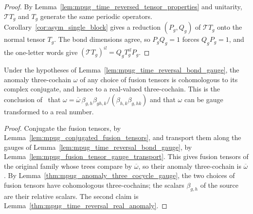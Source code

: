 \begin{proof}
    \leanok
    By Lemma~\ref{lem:mpug_time_reversed_tensor_properties} and
    unitarity, $\mathcal TT_g$ and $T_g$ generate the same periodic
    operators. Corollary~\ref{cor:asym_single_block} gives a reduction
    $(P_g,Q_g)$ of $\mathcal TT_g$ onto the normal tensor $T_g$. The bond
    dimensions agree, so $P_gQ_g=1$ forces $Q_gP_g=1$, and the one-letter
    words give $(\mathcal TT_g)^{il}=Q_gT_g^{il}P_g$.
\end{proof}

\begin{lemma}
    \label{lem:mpug_time_reversal_tensor_real_anomaly}
    \leanok
    Under the hypotheses of Lemma~\ref{lem:mpug_time_reversal_bond_gauge},
    the anomaly three-cochain $\omega$ of any choice of fusion tensors is
    cohomologous to its complex conjugate, and hence to a real-valued
    three-cochain. This is the conclusion
    of~\cite[Section~4.3]{GarreRubio2023MPOSym} that
    $\omega=\overline\omega\,\beta_{g,h}\beta_{gh,k}/(\beta_{h,k}\beta_{g,hk})$
    and that $\omega$ can be gauge transformed to a real number.
\end{lemma}

\begin{proof}
    \leanok
    Conjugate the fusion tensors, by
    Lemma~\ref{lem:mpug_conjugated_fusion_tensors}, and transport them
    along the gauges of Lemma~\ref{lem:mpug_time_reversal_bond_gauge}, by
    Lemma~\ref{lem:mpug_fusion_tensor_gauge_transport}. This gives fusion
    tensors of the original family whose trees compare by
    $\overline{\omega}$, so their anomaly three-cochain is $\overline\omega$.
    By Lemma~\ref{thm:mpug_anomaly_three_cocycle_gauge}, the two choices of
    fusion tensors have cohomologous three-cochains; the scalars $\beta_{g,h}$
    of the source are their relative scalars. The second claim is
    Lemma~\ref{thm:mpug_time_reversal_real_anomaly}.
\end{proof}

